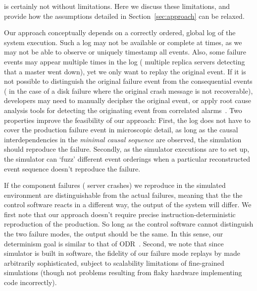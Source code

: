 \Simulator{} is certainly not without limitations. Here we discuss these
limitations, and provide how the assumptions
detailed in Section~\ref{sec:approach} can be relaxed.

 Our approach conceptually depends on a correctly ordered, global log of the
system execution. Such a log may not be available or complete at times, as we
may not be able to observe or uniquely timestamp all events.
Also, some failure events may appear multiple times in the log (\eg{}
multiple replica servers detecting that a master went down), yet we only want to
replay the original event. If it is not possible to distinguish the original
failure event from the consequential events (\eg{} in the case of a disk failure
where the original crash message is not recoverable), developers may need to
manually decipher the original event, or apply root cause analysis tools for
detecting the originating event from correlated alarms~\cite{577079}.
Two properties improve the feasibility of our approach: First, the log
does not have to cover the production failure event in microscopic detail,
as long as the causal interdependencies in the \emph{minimal causal sequence} are
observed, the simulation should reproduce the failure. Secondly, as the
simulator executions are to set up, the simulator can `fuzz' different event
orderings when a particular reconstructed event sequence doesn't reproduce the failure.


 If the
component failures (\eg{} server crashes) we reproduce in the simulated environment are
distinguishable from the actual failures, meaning that the the control software reacts in a different
way, the output of the system will differ. We first note that our approach
doesn't require precise instruction-deterministic
reproduction of the production. So long as the control software cannot
distinguish the two failure modes, the output should be the same. In this sense, our determinism goal is similar
to that of ODR~\cite{odr}. Second, we note that since simulator
is built in software, the fidelity of our failure mode
replays by made arbitrarily sophisticated, subject to scalability
limitations of fine-grained simulations (though not problems resulting from
flaky hardware implementing code incorrectly).


